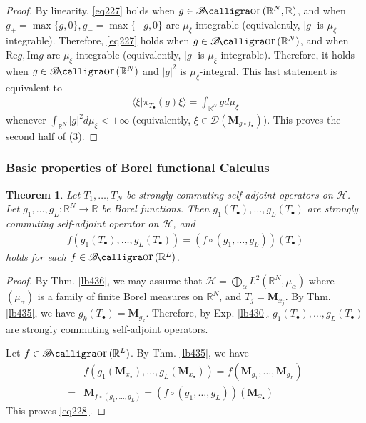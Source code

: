 \documentclass[12pt,b5paper,notitlepage]{article}
\theoremstyle{definition}
\theoremstyle{plain}
\newtheorem{thm}[df]{Theorem}
\DeclareMathOperator{\Bor}{\mathscr{B}\text{\kern -2pt {\calligra\large or}}\,}
\newcommand{\Dom}{\mathscr{D}}
\newcommand{\bk}[1]{\langle {#1}\rangle}
\newcommand{\blt}{\bullet}
\newcommand{\Rbb}{\mathbb R}
\newcommand{\Real}{\mathrm{Re}}
\newcommand{\Imag}{\mathrm{Im}}
\newcommand{\MH}{\mathcal H}
\newcommand{\Mbf}{\mathbf M}
\numberwithin{equation}{section}
\begin{document}
\begin{proof}
By linearity, \eqref{eq227} holds when $g\in\Bor(\Rbb^N,\Rbb)$, and when $g_+=\max\{g,0\},g_-=\max\{-g,0\}$ are $\mu_\xi$-integrable (equivalently, $|g|$ is $\mu_\xi$-integrable). Therefore, \eqref{eq227} holds when $g\in\Bor(\Rbb^N)$, and when $\Real g,\Imag g$ are $\mu_\xi$-integrable (equivalently, $|g|$ is $\mu_\xi$-integrable). Therefore, it holds when $g\in\Bor(\Rbb^N)$ and $|g|^2$ is $\mu_\xi$-integral. This last statement is equivalent to
\begin{align*}
\bk{\xi|\pi_{T_\blt}(g)\xi}=\int_{\Rbb^N}gd\mu_\xi
\end{align*}
whenever $\int_{\Rbb^N}|g|^2d\mu_\xi<+\infty$ (equivalently, $\xi\in\Dom(\Mbf_{g\circ f_\blt})$). This proves the second half of (3).
\end{proof}


\subsubsection{Basic properties of Borel functional Calculus}



\begin{thm}\label{lb437}
Let $T_1,\dots,T_N$ be strongly commuting self-adjoint operators on $\MH$. Let $g_1,\dots,g_L:\Rbb^N\rightarrow\Rbb$ be Borel functions. Then $g_1(T_\blt),\dots,g_L(T_\blt)$ are strongly commuting self-adjoint operator on $\MH$, and
\begin{align}\label{eq228}
f(g_1(T_\blt),\dots,g_L(T_\blt))=(f\circ(g_1,\dots,g_L))(T_\blt)
\end{align}
holds for each $f\in\Bor(\Rbb^L)$.
\end{thm}


\begin{proof}
By Thm. \ref{lb436}, we may assume that $\MH=\bigoplus_\alpha L^2(\Rbb^N,\mu_\alpha)$ where $(\mu_\alpha)$ is a family of finite Borel measures on $\Rbb^N$, and $T_j=\Mbf_{x_j}$. By Thm. \ref{lb435}, we have $g_k(T_\blt)=\Mbf_{g_k}$. Therefore, by Exp. \ref{lb430}, $g_1(T_\blt),\dots,g_L(T_\blt)$ are strongly commuting self-adjoint operators.

Let $f\in\Bor(\Rbb^L)$. By Thm. \ref{lb435}, we have
\begin{align*}
&f(g_1(\Mbf_{x_\blt}),\dots,g_L(\Mbf_{x_\blt}))=f(\Mbf_{g_1},\dots,\Mbf_{g_L})\\
=&\Mbf_{f\circ(g_1,\dots,g_L)}=(f\circ(g_1,\dots,g_L))(\Mbf_{x_\blt})
\end{align*}
This proves \eqref{eq228}.
\end{proof}
\end{document}
